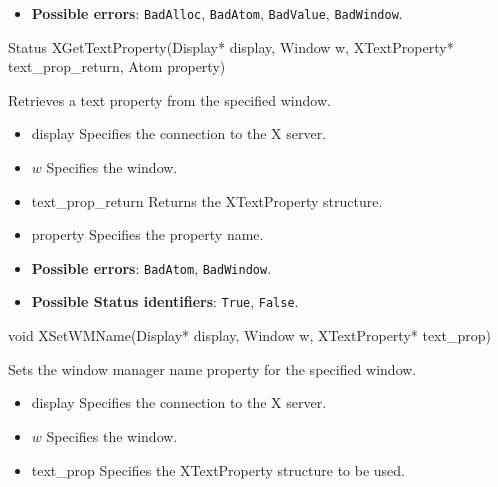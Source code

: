 \documentclass{report}
\begin{document}
\begin{itemize}
            \begin{itemize}
                \item \textbf{Possible errors}: \texttt{BadAlloc}, \texttt{BadAtom}, \texttt{BadValue}, \texttt{BadWindow}.
            \end{itemize}

            \begin{cppcode}
                Status XGetTextProperty(Display* display, Window w, XTextProperty* text_prop_return, Atom property)
            \end{cppcode}
            \bigbreak \noindent
            Retrieves a text property from the specified window.

            \begin{itemize}
                \item display Specifies the connection to the X server.
                \item $w$ Specifies the window.
                \item text\_prop\_return Returns the XTextProperty structure.
                \item property Specifies the property name.
            \end{itemize}

            \begin{itemize}
                \item \textbf{Possible errors}: \texttt{BadAtom}, \texttt{BadWindow}.
                \item \textbf{Possible Status identifiers}: \texttt{True}, \texttt{False}.
            \end{itemize}

            \begin{cppcode}
                void XSetWMName(Display* display, Window w, XTextProperty* text_prop)
            \end{cppcode}
            \bigbreak \noindent
            Sets the window manager name property for the specified window.

            \begin{itemize}
                \item display Specifies the connection to the X server.
                \item $w$ Specifies the window.
                \item text\_prop Specifies the XTextProperty structure to be used.
            \end{itemize}


\end{itemize}
\end{document}
